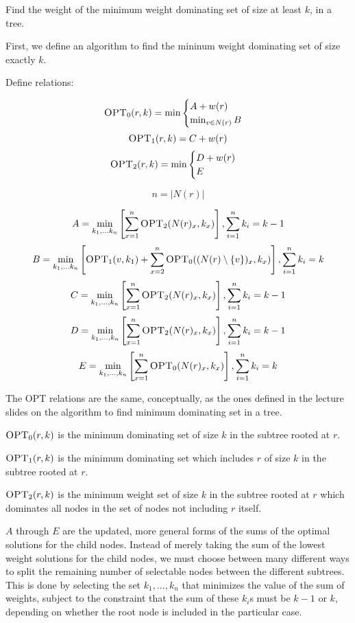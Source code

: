 \documentclass{article}
\begin{document}
Find the weight of the minimum weight dominating set of size at least $k$, in
a tree.

First, we define an algorithm to find the mininum weight dominating set of
size exactly $k$.

Define relations:

$$\textsc{OPT}_0(r, k) = \min 
\begin{cases} 
    A + w(r) \\
    \min_{v \in N(r)} B
\end{cases}$$
$$\textsc{OPT}_1(r, k) = C + w(r)$$
$$\textsc{OPT}_2(r, k) = \min
\begin{cases}
    D + w(r) \\
    E
\end{cases}$$

$$n = |N(r)|$$

$$A = \min_{k_1,...k_n} \left[\sum_{x = 1}^n \textsc{OPT}_2(N(r)_x, k_x) \right], \sum_{i=1}^n
k_i = k - 1$$
$$B = \min_{k_1,...k_n} \left[\textsc{OPT}_1(v,k_1) + \sum_{x = 2}^n
\textsc{OPT}_0((N(r) \setminus \{v\})_x, k_x) \right], \sum_{i=1}^n
k_i = k$$
$$C = \min_{k_1,...,k_n} \left[ \sum_{x=1}^n \textsc{OPT}_2(N(r)_x,k_x)\right], \sum_{i=1}^n
k_i = k - 1$$
$$D = \min_{k_1,...,k_n} \left[\sum_{x=1}^n \textsc{OPT}_2(N(r)_x, k_x)\right], \sum_{i=1}^n
k_i = k - 1 $$
$$E = \min_{k_1,...,k_n} \left[\sum_{x=1}^n \textsc{OPT}_0(N(r)_x, k_x)\right], \sum_{i=1}^n
k_i = k$$

The \textsc{OPT} relations are the same, conceptually, as the ones defined in
the lecture slides on the algorithm to find minimum dominating set in a tree.

$\textsc{OPT}_0(r, k)$ is the minimum dominating set of size $k$ in the
subtree rooted at $r$.

$\textsc{OPT}_1(r, k)$ is the minimum dominating set which includes $r$ of size $k$ in the
subtree rooted at $r$.

$\textsc{OPT}_2(r, k)$ is the minimum weight set of size $k$ in the subtree
rooted at $r$ which dominates all nodes in the set of nodes not including $r$
itself.

$A$ through $E$ are the updated, more general forms of the sums of the optimal
solutions for the child nodes. Instead of merely taking the sum of the lowest
weight solutions for the child nodes, we must choose between many different
ways to split the remaining number of selectable nodes between the different
subtrees. This is done by selecting the set $k_1,...,k_n$ that minimizes the
value of the sum of weights, subject to the constraint that the sum of these $k_i$s must be $k-1$ or
$k$, depending on whether the root node is included in the particular case.
\end{document}
